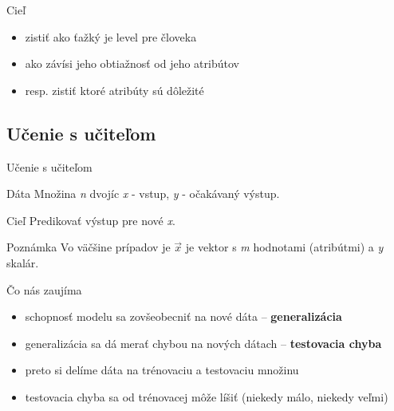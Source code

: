 \documentclass[xcolor={table}]{beamer}
\begin{document}
			\begin{frame}{Cieľ}
				\begin{block}{}
					\begin{itemize}
						\item zistiť ako ťažký je level pre človeka
						\item ako závísi jeho obtiažnosť od jeho atribútov
						\item resp. zistiť ktoré atribúty sú dôležité
					\end{itemize}
				\end{block}
			\end{frame}
		\subsection{Učenie s učiteľom}
			\begin{frame}{Učenie s učiteľom}
				\begin{block}{Dáta}
					Množina \emph{n} dvojíc \emph{x} - vstup, \emph{y} - očakávaný výstup.
				\end{block}
				\begin{block}{Cieľ}
					Predikovať výstup pre nové \emph{x}.
				\end{block}
				\begin{block}{Poznámka}
					Vo väčšine prípadov je $\vec{x}$ je vektor s \emph{m} hodnotami (atribútmi) a \emph{y} skalár.
				\end{block}
			\end{frame}
			\begin{frame}{Čo nás zaujíma}
				\begin{block}{}
					\begin{itemize}
						\item schopnosť modelu sa zovšeobecniť na nové dáta – \textbf{generalizácia}
						\item generalizácia sa dá merať chybou na nových dátach – \textbf{testovacia chyba}
						\item preto si delíme dáta na trénovaciu a testovaciu množinu
						\item testovacia chyba sa od trénovacej môže líšiť (niekedy málo, niekedy veľmi)			
					\end{itemize}				
				\end{block}
			\end{frame}			
\end{document}
